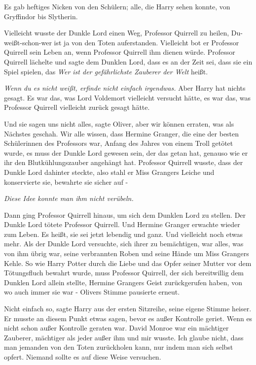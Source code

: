 Es gab heftiges Nicken von den Schülern; alle, die Harry sehen konnte, von
Gryffindor bis Slytherin.

\glqq{}Vielleicht wusste der Dunkle Lord einen Weg, Professor Quirrell zu heilen,
Du-weißt-schon-wer ist ja von den Toten auferstanden. Vielleicht bot er
Professor Quirrell sein Leben an, wenn Professor Quirrell ihm dienen würde.
Professor Quirrell lächelte und sagte dem Dunklen Lord, dass es an der Zeit sei,
dass sie ein Spiel spielen, das \emph{\glqq{}Wer ist der gefährlichste Zauberer
der Welt\grqq{}} heißt.\emph{\grqq}

\emph{Wenn du es nicht weißt, erfinde nicht einfach irgendwas.}
Aber Harry hat nichts gesagt. Es war das, was Lord Voldemort vielleicht versucht
hätte, es war das, was Professor Quirrell vielleicht zurück gesagt hätte.

\glqq{}Und sie sagen uns nicht alles\grqq{}, sagte Oliver, \glqq{}aber wir können
erraten, was als Nächstes geschah. Wir alle wissen, dass Hermine Granger, die
eine der besten Schülerinnen des Professors war, Anfang des Jahres von einem
Troll getötet wurde, es muss der Dunkle Lord gewesen sein, der das getan hat,
genauso wie er ihr den Blutkühlungszauber angehängt hat. Professor Quirrell
wusste, dass der Dunkle Lord dahinter steckte, also stahl er Miss Grangers
Leiche und konservierte sie, bewahrte sie sicher auf -\grqq{}

\emph{Diese Idee konnte man ihm nicht verübeln.}

\glqq{}Dann ging Professor Quirrell hinaus, um sich dem Dunklen Lord zu stellen.
Der Dunkle Lord tötete Professor Quirrell. Und Hermine Granger erwachte wieder
zum Leben. Es heißt, sie sei jetzt lebendig und ganz. Und vielleicht noch etwas
mehr. Als der Dunkle Lord versuchte, sich ihrer zu bemächtigen, war alles, was
von ihm übrig war, seine verbrannten Roben und seine Hände um Miss Grangers
Kehle. So wie Harry Potter durch die Liebe und das Opfer seiner Mutter vor dem
Tötungsfluch bewahrt wurde, muss Professor Quirrell, der sich bereitwillig dem
Dunklen Lord allein stellte, Hermine Grangers Geist zurückgerufen haben, von wo
auch immer sie war -\grqq{} Olivers Stimme pausierte erneut.

\glqq{}Nicht einfach so\grqq{}, sagte Harry aus der ersten Sitzreihe, seine
eigene Stimme heiser. Er musste an diesem Punkt etwas sagen, bevor es außer
Kontrolle geriet. Wenn es nicht schon außer Kontrolle geraten war. \glqq{}David
Monroe war ein mächtiger Zauberer, mächtiger als jeder außer ihm und mir wusste.
Ich glaube nicht, dass man jemanden von den Toten zurückholen kann, nur indem
man sich selbst opfert. Niemand sollte es auf diese Weise versuchen.\grqq{}

